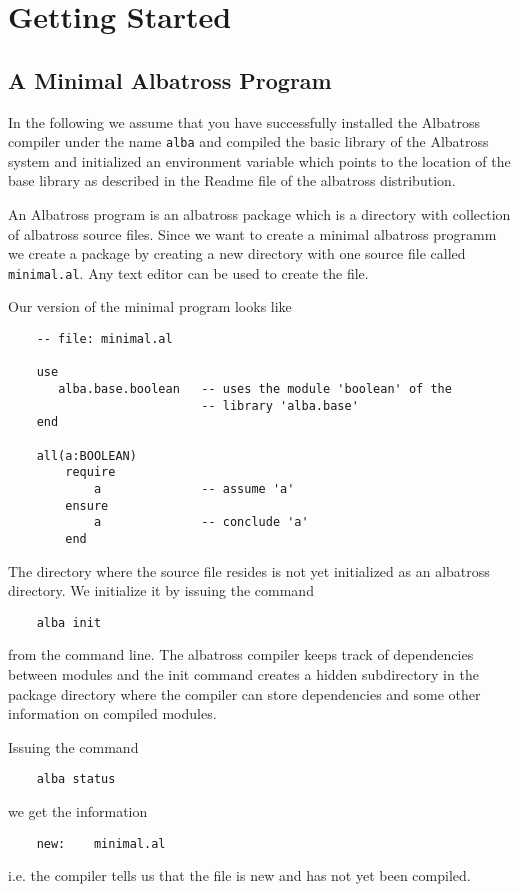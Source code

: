\section{Getting Started}

\subsection{A Minimal Albatross Program}

In the following we assume that you have successfully installed the Albatross
compiler under the name \lstinline!alba! and compiled the basic library of the
Albatross system and initialized an environment variable which points to the
location of the base library as described in the Readme file of the albatross
distribution.


An Albatross program is an albatross package which is a directory with
collection of albatross source files. Since we want to create a minimal
albatross programm we create a package by creating a new directory with one
source file called \lstinline!minimal.al!. Any text editor can be used to create the
file.

Our version of the minimal program looks like

\begin{lstlisting}
    -- file: minimal.al

    use
       alba.base.boolean   -- uses the module 'boolean' of the
                           -- library 'alba.base'
    end

    all(a:BOOLEAN)
        require
            a              -- assume 'a'
        ensure
            a              -- conclude 'a'
        end
\end{lstlisting}

The directory where the source file resides is not yet initialized as an
albatross directory. We initialize it by issuing the command
\begin{lstlisting}
    alba init
\end{lstlisting}
from the command line. The albatross compiler keeps track of dependencies
between modules and the init command creates a hidden subdirectory in the
package directory where the compiler can store dependencies and some other
information on compiled modules.

Issuing the command
\begin{lstlisting}
    alba status
\end{lstlisting}
we get the information
\begin{lstlisting}
    new:    minimal.al
\end{lstlisting}
i.e. the compiler tells us that the file is new and has not yet been compiled.

